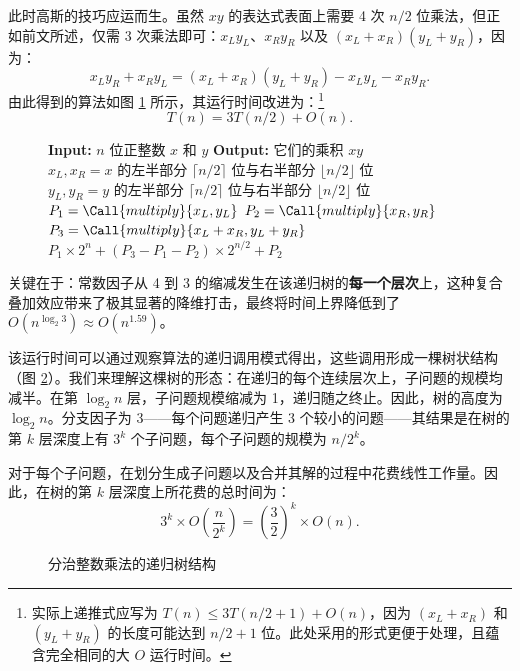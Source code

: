 此时高斯的技巧应运而生。虽然 $xy$ 的表达式表面上需要 4 次 $n/2$ 位乘法，但正如前文所述，仅需 3 次乘法即可：$x_L y_L$、$x_R y_R$ 以及 $(x_L + x_R)(y_L + y_R)$，因为：
\[
x_L y_R + x_R y_L = (x_L + x_R)(y_L + y_R) - x_L y_L - x_R y_R.
\]
由此得到的算法如图 \ref{fig:dnc_mult} 所示，其运行时间改进为：\footnote{实际上递推式应写为 $T(n) \le 3T(n/2 + 1) + O(n)$，因为 $(x_L + x_R)$ 和 $(y_L + y_R)$ 的长度可能达到 $n/2 + 1$ 位。此处采用的形式更便于处理，且蕴含完全相同的大 $O$ 运行时间。}
\[
T(n) = 3T(n/2) + O(n).
\]

\begin{figure}[htbp]
\centering
\begin{tcolorbox}[colback=white,colframe=gray!50!black,title={\textbf{图 2.1}\quad 整数乘法的分治算法 (Karatsuba 乘法)}]
\begin{algorithmic}[1]
    \State \textbf{Input:} $n$ 位正整数 $x$ 和 $y$
    \State \textbf{Output:} 它们的乘积
     \Return $xy$ \EndIf
    \State $x_L, x_R = x \text{ 的左半部分 } \lceil n/2 \rceil \text{ 位与右半部分 } \lfloor n/2 \rfloor \text{ 位}$
    \State $y_L, y_R = y \text{ 的左半部分 } \lceil n/2 \rceil \text{ 位与右半部分 } \lfloor n/2 \rfloor \text{ 位}$
    \State $P_1 = \Call{multiply}{x_L, y_L}$
    \State $P_2 = \Call{multiply}{x_R, y_R}$
    \State $P_3 = \Call{multiply}{x_L + x_R, y_L + y_R}$
    \State \Return $P_1 \times 2^n + (P_3 - P_1 - P_2) \times 2^{n/2} + P_2$
\EndFunction
\end{algorithmic}
\end{tcolorbox}
\label{fig:dnc_mult}
\end{figure}

关键在于：常数因子从 4 到 3 的缩减发生在该递归树的\textbf{每一个层次}上，这种复合叠加效应带来了极其显著的降维打击，最终将时间上界降低到了 $O(n^{\log_2 3}) \approx O(n^{1.59})$。

该运行时间可以通过观察算法的递归调用模式得出，这些调用形成一棵树状结构（图 \ref{fig:mult_recursion_tree}）。我们来理解这棵树的形态：在递归的每个连续层次上，子问题的规模均减半。在第 $\log_2 n$ 层，子问题规模缩减为 1，递归随之终止。因此，树的高度为 $\log_2 n$。分支因子为 3——每个问题递归产生 3 个较小的问题——其结果是在树的第 $k$ 层深度上有 $3^k$ 个子问题，每个子问题的规模为 $n/2^k$。

对于每个子问题，在划分生成子问题以及合并其解的过程中花费线性工作量。因此，在树的第 $k$ 层深度上所花费的总时间为：
\[
3^k \times O\left(\frac{n}{2^k}\right) = \left(\frac{3}{2}\right)^k \times O(n).
\]

\begin{figure}[htbp]
\centering
{}
\caption{分治整数乘法的递归树结构}
\label{fig:mult_recursion_tree}
\end{figure}

